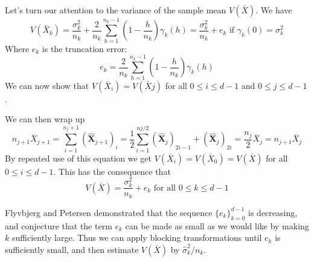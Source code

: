 \documentclass[a4paper, 10pt, english]{revtex4-2} %
\newcommand{\txt}[1]{\text{#1}}
\begin{document}
        Let's turn our attention to the variance of the sample mean $V(\bar{X})$.
        We have
        \begin{equation}
                V(\bar{X}_k)
            =   \frac{\sigma_k^2}{n_k} + \frac{2}{n_k} \sum_{h=1}^{n_k - 1} \left(1 - \frac{h}{n_k}\right)\gamma_k(h)
            =   \frac{\sigma_k^2}{n_k} + e_k 
            \txt{ if }
                \gamma_k(0)
            =   \sigma_k^2
        \end{equation}
        Where $e_k$ is the truncation error:
        \begin{equation}
                e_k 
            =   \frac{2}{n_k} \sum_{h=1}^{n_k - 1} \left(1 - \frac{h}{n_k}\right)\gamma_k(h)
        \end{equation}
        We can now show that $V(\bar{X}_i) = V(\bar{X}j)$ for all $0 \leq i \leq d - 1$ and $0 \leq j \leq d - 1$.

        We can then wrap up
        \begin{equation}
                n_{j+1}\bar{X}_{j+1}
            =   \sum_{i=1}^{n_j+1} (\hat{\mathbf{X}}_{j+1})_i
            =   \frac{1}{2} \sum_{i=1}^{nj/2} (\hat{\mathbf{X}}_j)_{2i - 1} + (\hat{\mathbf{X}}_j)_{2i}
            =   \frac{n_j}{2}\bar{X}_j
            =   n_{j + 1} \bar{X}_j
        \end{equation}
        By repeated use of this equation we get $V(\bar{X}_i) = V(\bar{X}_0) = V(\bar{X})$ for all $0 \leq i \leq d - 1$.
        This has the consequence that 
        \begin{equation}
                V(\bar{X})
            =   \frac{\sigma_k^2}{n_k} + e_k 
            \txt{ for all }
                0 \leq k \leq d - 1
        \end{equation}

        Flyvbjerg and Petersen demonstrated that the sequence $\{e_k\}_{k=0}^{d-1}$ is decreasing, and conjecture that the term $e_k$ can be made as small as we would like by making $k$ sufficiently large. Thus we can apply blocking transformations until $e_k$ is sufficiently small, and then estimate $V(\bar{X})$ by $\hat{\sigma}_k^2 / n_k$.
        
\end{document}

